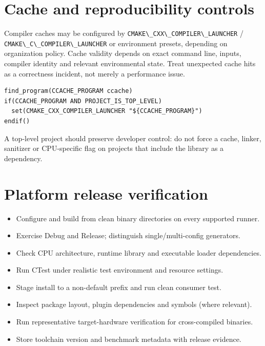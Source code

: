 \documentclass[11pt,letterpaper,oneside]{report}
\providecommand{\tightlist}{\setlength{\itemsep}{0pt}\setlength{\parskip}{0pt}}
\providecommand{\passthrough}[1]{#1}
\begin{document}
\chapter{Cache and reproducibility
controls}\label{cache-and-reproducibility-controls}

Compiler caches may be configured by
\passthrough{\lstinline!CMAKE\_CXX\_COMPILER\_LAUNCHER!} /
\passthrough{\lstinline!CMAKE\_C\_COMPILER\_LAUNCHER!} or environment
presets, depending on organization policy. Cache validity depends on
exact command line, inputs, compiler identity and relevant environmental
state. Treat unexpected cache hits as a correctness incident, not merely
a performance issue.

\begin{lstlisting}
find_program(CCACHE_PROGRAM ccache)
if(CCACHE_PROGRAM AND PROJECT_IS_TOP_LEVEL)
  set(CMAKE_CXX_COMPILER_LAUNCHER "${CCACHE_PROGRAM}")
endif()
\end{lstlisting}

A top-level project should preserve developer control: do not force a
cache, linker, sanitizer or CPU-specific flag on projects that include
the library as a dependency.

\chapter{Platform release
verification}\label{platform-release-verification}

\begin{itemize}
\tightlist
\item[$\square$]
  Configure and build from clean binary directories on every supported
  runner.
\item[$\square$]
  Exercise Debug and Release; distinguish single/multi-config
  generators.
\item[$\square$]
  Check CPU architecture, runtime library and executable loader
  dependencies.
\item[$\square$]
  Run CTest under realistic test environment and resource settings.
\item[$\square$]
  Stage install to a non-default prefix and run clean consumer test.
\item[$\square$]
  Inspect package layout, plugin dependencies and symbols (where
  relevant).
\item[$\square$]
  Run representative target-hardware verification for cross-compiled
  binaries.
\item[$\square$]
  Store toolchain version and benchmark metadata with release evidence.
\end{itemize}
\end{document}
